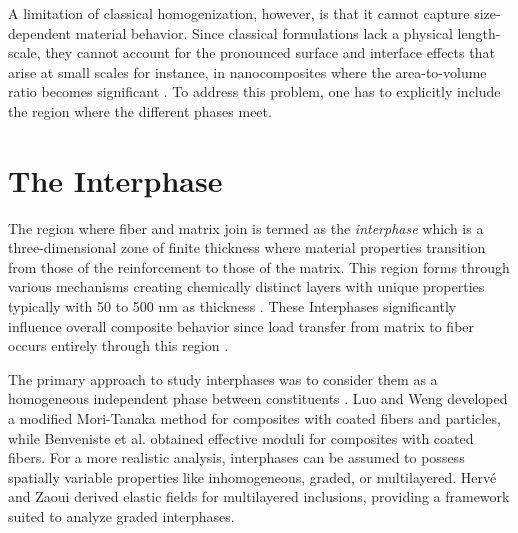 \documentclass[oneside, 12pt, a4paper, bibliography=totoc]{book}
\begin{document}
A limitation of classical homogenization, however, is that it cannot capture size-dependent material behavior. Since classical formulations lack a physical length-scale, they cannot account for the pronounced surface and interface effects that arise at small scales for instance, in nanocomposites where the area-to-volume ratio becomes significant \cite{Duan2005, Sharma2003}. To address this problem, one has to explicitly include the region where the different phases meet.


\section{The Interphase}
\label{sec:interphase}

The region where fiber and matrix join is termed as the \textit{interphase} which is a three-dimensional zone of finite thickness where material properties transition from those of the reinforcement to those of the matrix. This region forms through various mechanisms creating chemically distinct layers with unique properties typically with 50 to 500 nm as thickness \cite{Jones1991}. These Interphases significantly influence overall composite behavior since load transfer from matrix to fiber occurs entirely through this region \cite{Kim1998}.

The primary approach to study interphases was to consider them as a homogeneous independent phase between constituents \cite{Walpole1978}. Luo and Weng \cite{Luo1987, Luo1989} developed a modified Mori-Tanaka method for composites with coated fibers and particles, while Benveniste et al. \cite{Benveniste1989} obtained effective moduli for composites with coated fibers. For a more realistic analysis, interphases can be assumed to possess spatially variable properties like inhomogeneous, graded, or multilayered. Herv\'{e} and Zaoui \cite{Herve1993, Herve1995} derived elastic fields for multilayered inclusions, providing a framework suited to analyze graded interphases.
\end{document}
